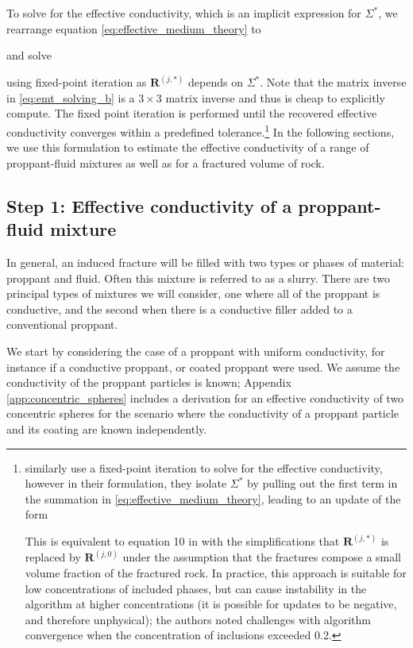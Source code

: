 To solve for the effective conductivity, which is an implicit expression for $\Sigma^*$, we rearrange equation \ref{eq:effective_medium_theory} to

and solve

using fixed-point iteration as $\mathbf{R}^{(j, *)}$ depends on $\Sigma^*$. Note that the matrix inverse in \ref{eq:emt_solving_b} is a $3\times 3$ matrix inverse and thus is cheap to explicitly compute. The fixed point iteration is performed until the recovered effective conductivity converges within a predefined tolerance.\footnote{\cite{Berryman2013} similarly use a fixed-point iteration to solve for the effective conductivity, however in their formulation, they isolate $\Sigma^*$ by pulling out the first term in the summation in \ref{eq:effective_medium_theory}, leading to an update of the form

This is equivalent to equation 10 in \cite{Berryman2013} with the simplifications that $\mathbf{R}^{(j, *)}$ is replaced by $\mathbf{R}^{(j, 0)}$ under the assumption that the fractures compose a small volume fraction of the fractured rock. In practice, this approach is suitable for low concentrations of included phases, but can cause instability in the algorithm at higher concentrations (it is possible for updates to be negative, and therefore unphysical); the authors noted challenges with algorithm convergence when the concentration of inclusions exceeded 0.2.} In the following sections, we use this formulation to estimate the effective conductivity of a range of proppant-fluid mixtures as well as for a fractured volume of rock.

\subsection{Step 1: Effective conductivity of a proppant-fluid mixture}
In general, an induced fracture will be filled with two types or phases of material: proppant and fluid. Often this mixture is referred to as a slurry. There are two principal types of mixtures we will consider, one where all of the proppant is conductive, and the second when there is a conductive filler added to a conventional proppant.

We start by considering the case of a proppant with uniform conductivity, for instance if a conductive proppant, or coated proppant were used. We assume the conductivity of the proppant particles is known; Appendix \ref{app:concentric_spheres} includes a derivation for an effective conductivity of two concentric spheres for the scenario where the conductivity of a proppant particle and its coating are known independently.

